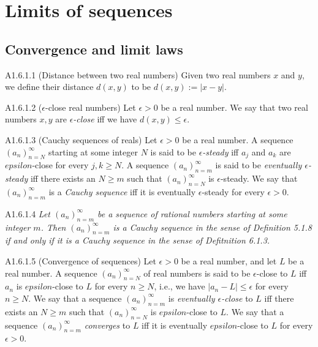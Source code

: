 \section{Limits of sequences}
\subsection{Convergence and limit laws}
\begin{definition}{A1.6.1.1}
    (Distance between two real numbers) Given two real numbers $x$ and $y$, we
    define their distance $d(x, y)$ to be $d(x, y) := |x - y|$.
\end{definition}

\begin{definition}{A1.6.1.2}
    ($\epsilon$-close real numbers) Let $\epsilon > 0$ be a real number. We say that
    two real numbers $x, y$ are \emph{$\epsilon$-close} iff we have $d(x, y) \leq \epsilon$.
\end{definition}

\begin{definition}{A1.6.1.3}
    (Cauchy sequences of reals) Let $\epsilon > 0$ be a real number. A sequence
    $(a_n)_{n=N}^{\infty}$ starting at some integer $N$ is said to be \emph{$\epsilon$-steady}
    iff $a_j$ and $a_k$ are $epsilon$-close for every $j, k \geq N$. A sequence
    $(a_n)_{n=m}^{\infty}$ is said to be \emph{eventually $\epsilon$-steady} iff
    there exists an $N \geq m$ such that $(a_n)_{n=N}^{\infty}$ is $\epsilon$-steady.
    We say that $(a_n)_{n=m}^{\infty}$ is a \emph{Cauchy sequence} iff it is
    eventually $\epsilon$-steady for every $\epsilon > 0$.
\end{definition}

\begin{proposition}{A1.6.1.4}
    \emph{Let $(a_n)_{n=m}^{\infty}$ be a sequence of rational numbers starting
    at some integer $m$. Then $(a_n)_{n=m}^{\infty}$ is a Cauchy sequence in the
    sense of Definition 5.1.8 if and only if it is a Cauchy sequence in the sense
    of Defitnition 6.1.3.}
\end{proposition}

\begin{definition}{A1.6.1.5}
    (Convergence of sequences) Let $\epsilon > 0$ be a real number, and let $L$
    be a real number. A sequence $(a_n)_{n=N}^{\infty}$ of real numbers is said
    to be $\epsilon$-close to $L$ iff $a_n$ is $epsilon$-close to $L$ for every
    $n \geq N$, i.e., we have $|a_n - L| \leq \epsilon$ for every $n \geq N$.
    We say that a sequence $(a_n)_{n=m}^{\infty}$ is \emph{eventually $\epsilon$-close}
    to $L$ iff there exists an $N \geq m$ such that $(a_n)_{n=N}^{\infty}$
    is $epsilon$-close to $L$. We say that a sequence $(a_n)_{n=m}^{\infty}$
    \emph{converges} to $L$ iff it is eventually $epsilon$-close to $L$ for every
    $\epsilon > 0$.
\end{definition}

